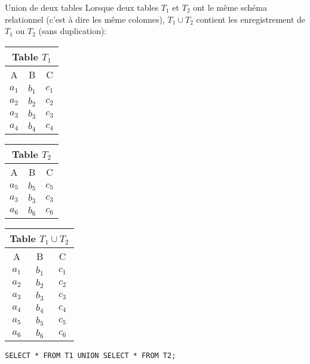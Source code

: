 \documentclass[10pt]{beamer}
\begin{document}
\begin{frame}
	\begin{block}{Union de deux tables}
		Lorsque deux tables $T_1$ et $T_2$ ont \textcolor{BrickRed}{le même schéma relationnel} (c'est à dire les même colonnes), $T_1 \cup T_2$ contient les enregistrement de $T_1$ ou $T_2$ (sans duplication):
		\begin{center}
			\begin{tabular}{|c|c|c|}
				\multicolumn{3}{c}{\textcolor{Sepia}{Table $T_1$}} \\
				\hline
				\rowcolor{lightgray} A & B     & C                 \\
				\hline
				$a_1$                  & $b_1$ & $c_1$             \\
				\hline
				$a_2$                  & $b_2$ & $c_2$             \\
				\hline
				$a_3$                  & $b_3$ & $c_3$             \\
				\hline
				$a_4$                  & $b_4$ & $c_4$             \\
				\hline
			\end{tabular} \quad \quad
			\begin{tabular}{|c|c|c|}
				\multicolumn{3}{c}{\textcolor{Sepia}{Table $T_2$}} \\
				\hline
				\rowcolor{lightgray} A & B     & C                 \\
				\hline
				$a_5$                  & $b_5$ & $c_5$             \\
				\hline
				$a_3$                  & $b_3$ & $c_3$             \\
				\hline
				$a_6$                  & $b_6$ & $c_6$             \\
				\hline
			\end{tabular}
			\quad \quad
			\begin{tabular}{|c|c|c|}
				\multicolumn{3}{c}{\textcolor{Sepia}{Table $T_1 \cup T_2$}} \\
				\hline
				\rowcolor{lightgray} A & B     & C                          \\
				\hline
				$a_1$                  & $b_1$ & $c_1$                      \\
				\hline
				$a_2$                  & $b_2$ & $c_2$                      \\
				\hline
				$a_3$                  & $b_3$ & $c_3$                      \\
				\hline
				$a_4$                  & $b_4$ & $c_4$                      \\
				\hline
				$a_5$                  & $b_5$ & $c_5$                      \\
				\hline
				$a_6$                  & $b_6$ & $c_6$                      \\
				\hline
			\end{tabular}
		\end{center} \medskip
		\texttt{SELECT * FROM T1 UNION SELECT * FROM T2;}
	\end{block}
\end{frame}
\end{document}
